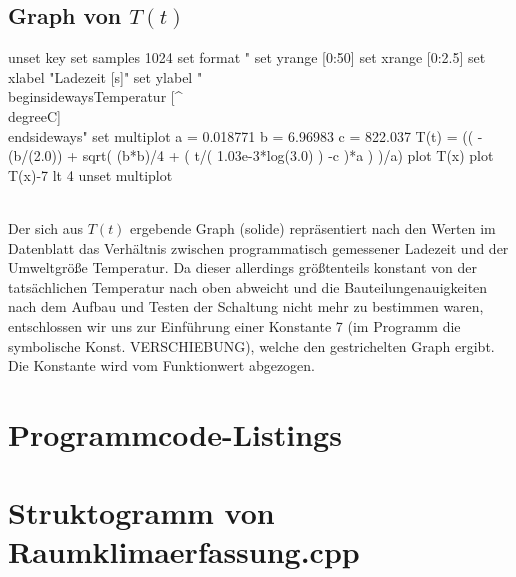 \documentclass[12pt,titlepage]{article}
\begin{document}
		\subsection{Graph von $T(t)$}
		\begin{gnuplot}
			unset key
			set samples 1024
			set format "%
			set yrange [0:50]
			set xrange [0:2.5]
			set xlabel "Ladezeit [s]"
			set ylabel "\\begin{sideways}Temperatur [^{\\degree}C]\\end{sideways}"
			set multiplot
			a = 0.018771
			b = 6.96983
			c =  822.037
			T(t) = (( -(b/(2.0)) + sqrt( (b*b)/4 + ( t/( 1.03e-3*log(3.0) ) -c )*a ) )/a)
			plot T(x)
			plot T(x)-7 lt 4
			unset multiplot
		\end{gnuplot}
		\hfill\\
		Der sich aus $T(t)$ ergebende Graph (solide) repräsentiert nach den Werten im Datenblatt das Verhältnis zwischen programmatisch gemessener Ladezeit und der Umweltgröße Temperatur. Da dieser allerdings größtenteils konstant von der tatsächlichen Temperatur nach oben abweicht und die Bauteilungenauigkeiten nach dem Aufbau und Testen der Schaltung nicht mehr zu bestimmen waren, entschlossen wir uns zur Einführung einer Konstante 7 (im Programm die symbolische Konst. VERSCHIEBUNG), welche den gestrichelten Graph ergibt. Die Konstante wird vom Funktionwert abgezogen.
		
\section{Programmcode-Listings}
	
	
	

\section{Struktogramm von Raumklimaerfassung.cpp}
	
\end{document}
